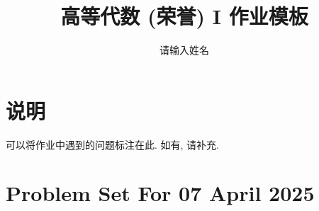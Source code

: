 \documentclass[11pt]{ctexart}
\title{高等代数 (荣誉) I 作业模板}
\author{请输入姓名}
\theoremstyle{definition}
\numberwithin{equation}{section}
\theoremstyle{definition}
\theoremstyle{remark}
\begin{document}
\maketitle

\section{说明}

可以将作业中遇到的问题标注在此. 如有, 请补充.

\tableofcontents

\newpage


\section{Problem Set For 07 April 2025}
\end{document}
